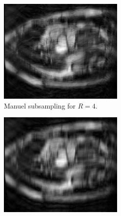 \begin{figure}[h] %
	\centering
	\begin{subfigure}{0.3\textwidth}
    		\includegraphics[width=\textwidth]{./Images/ManuelSubsampling_ACDC_R=4.png}
    		\caption{Manuel subsampling for $R=4$.}
    		\label{fig:ManuelSubsampling_ACDC_R=4}
	\end{subfigure}
	\hfill 
	\begin{subfigure}{0.3\textwidth}
    		\includegraphics[width=\textwidth]{./Images/ManuelSubsampling_ACDC_R=8.png}

\end{subfigure}
\end{figure}
